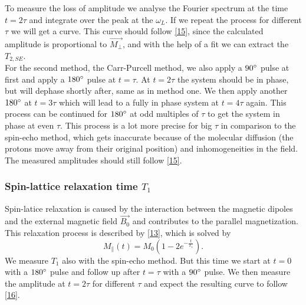 To measure the loss of amplitude we analyse the Fourier spectrum at the time $t=2\tau$ and integrate over the peak at the $\omega_L$. If we repeat the process for different $\tau$ we will get a curve. This curve should follow \eqref{15}, since the calculated amplitude is proportional to $\vec{M_{\perp}}$, and with the help of a fit we can extract the $T_{2,SE}$.
\vspace{3mm} \\
For the second method, the Carr-Purcell method, we also apply a $90\degree$ pulse at first and apply a $180\degree$ pulse at $t=\tau$. At $t=2\tau$ the system should be in phase, but will dephase shortly after, same as in method one. We then apply another $180\degree$ at $t=3\tau$ which will lead to a fully in phase system at $t=4\tau$ again. This process can be continued for $180\degree$ at odd multiples of $\tau$ to get the system in phase at even $\tau$. This process is a lot more precise for big $\tau$ in comparison to the spin-echo method, which gets inaccurate because of the molecular diffusion (the protons move away from their original position) and inhomogeneities in the field.\\
The measured amplitudes should still follow \eqref{15}.
\subsubsection{Spin-lattice relaxation time $T_{1}$}
Spin-latice relaxation is caused by the interaction between the magnetic dipoles and the external magnetic field $\vec{B_0}$ and contributes to the parallel magnetization. This relaxation process is described by \eqref{13}, which is solved by
\begin{equation}
	\label{16}
	M_{\parallel}(t) = M_{0}(1-2e^{-\frac{t}{T_{1}}}).
\end{equation}
We measure $T_1$ also with the spin-echo method. But this time we start at $t=0$ with a $180\degree$ pulse and follow up after $t=\tau$ with a $90\degree$ pulse. We then measure the amplitude at $t=2\tau$ for different $\tau$ and expect the resulting curve to follow \eqref{16}.
